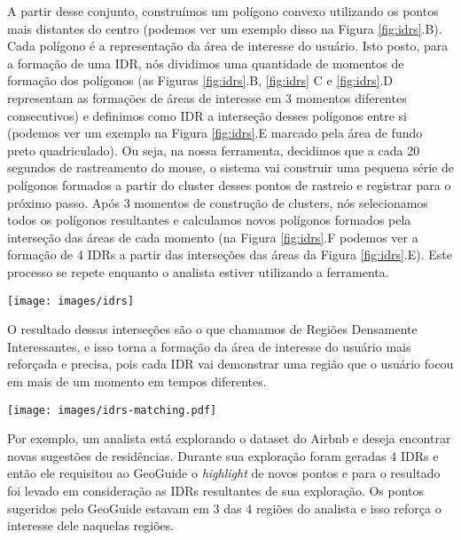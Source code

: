 A partir desse conjunto, construímos um polígono convexo utilizando os pontos mais distantes do centro (podemos ver um exemplo disso na Figura \ref{fig:idrs}.B). Cada polígono é a representação da área de interesse do usuário. Isto posto, para a formação de uma IDR, nós dividimos uma quantidade de momentos de formação dos polígonos (as Figuras \ref{fig:idrs}.B, \ref{fig:idrs} C e \ref{fig:idrs}.D representam as formações de áreas de interesse em 3 momentos diferentes consecutivos) e definimos como IDR a interseção desses polígonos entre si (podemos ver um exemplo na Figura \ref{fig:idrs}.E marcado pela área de fundo preto quadriculado). Ou seja, na nossa ferramenta, decidimos que a cada 20 segundos de rastreamento do mouse, o sistema vai construir uma pequena série de polígonos formados a partir do cluster desses pontos de rastreio e registrar para o próximo passo. Após 3 momentos de construção de clusters, nós selecionamos todos os polígonos resultantes e calculamos novos polígonos formados pela interseção das áreas de cada momento (na Figura \ref{fig:idrs}.F podemos ver a formação de 4 IDRs a partir das interseções das áreas da Figura \ref{fig:idrs}.E). Este processo se repete enquanto o analista estiver utilizando a ferramenta.

\begin{figure*}[t]
	\centering
	\texttt{[image: images/idrs]}
	\caption{Figura do processo de construção de IDRs}
	\label{fig:idrs-geoguide}
	\vspace{-10pt}
\end{figure*}

O resultado dessas interseções são o que chamamos de Regiões Densamente Interessantes, e isso torna a formação da área de interesse do usuário mais reforçada e precisa, pois cada IDR vai demonstrar uma região que o usuário focou em mais de um momento em tempos diferentes.

\begin{figure*}[t]
	\centering
	\texttt{[image: images/idrs-matching.pdf]}
	\caption{Figura das sugestões do GeoGuide relacionadas com as IDRs do analista}
	\label{fig:idrs}
	\vspace{-10pt}
\end{figure*}

Por exemplo, um analista está explorando o dataset do Airbnb e deseja encontrar novas sugestões de residências. Durante sua exploração foram geradas 4 IDRs e então ele requisitou ao GeoGuide o \textit{highlight} de novos pontos e para o resultado foi levado em consideração as IDRs resultantes de sua exploração. Os pontos sugeridos pelo GeoGuide estavam em 3 das 4 regiões do analista e isso reforça o interesse dele naquelas regiões.

